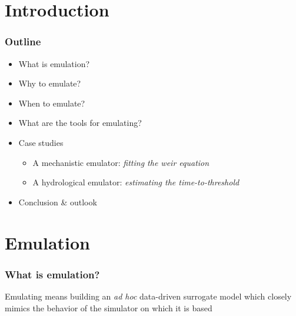 \documentclass[xcolor=dvipsnames, USenglish]{beamer}  %
\begin{document}
\section{Introduction}

  \begin{frame}
    \frametitle{Outline}
    \begin{itemize}
      \item What is emulation?
      \item Why to emulate?
      \item When to emulate?
      \item What are the tools for emulating?
      \item Case studies
      \begin{itemize}
        \item A mechanistic emulator: \emph{fitting the weir equation}
        \item A hydrological emulator: \emph{estimating the time-to-threshold}
      \end{itemize}
      \item Conclusion \& outlook
     \end{itemize}
  \end{frame}


\section{Emulation}
  \begin{frame}
    \frametitle{What is emulation?}
    Emulating means building an \emph{ad hoc} data-driven surrogate model which
    closely mimics the behavior of the simulator on which it is based

    \begin{figure}[b]
      \centering
        \hspace{.5cm}
    \end{figure}
    \centering
  \end{frame}
\end{document}
